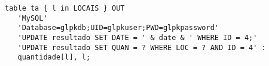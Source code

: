 \documentclass[11pt, brazil]{report}
\def\para#1{\noindent{\bf#1}}
\begin{document}
\begin{verbatim}
table ta { l in LOCAIS } OUT
   'MySQL'
   'Database=glpkdb;UID=glpkuser;PWD=glpkpassword'
   'UPDATE resultado SET DATE = ' & date & ' WHERE ID = 4;'
   'UPDATE resultado SET QUAN = ? WHERE LOC = ? AND ID = 4' :
   quantidade[l], l;
\end{verbatim}


%
%
%
%
%
%
%
%
%
%
%
%
%
%
%
%
%
%
%
%
\end{document}
